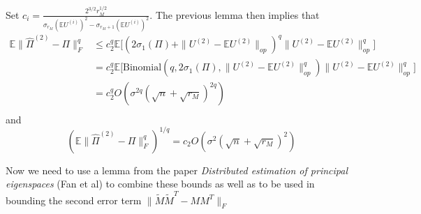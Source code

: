 \documentclass[notheorems]{beamer}
\theoremstyle{definition}
\begin{document}
\begin{frame}
Set $c_i = \frac{2^{3/2}r_M^{1/2}}{\sigma_{r_M}(\mathbb{E}U^{(i)})^2 - \sigma_{r_M + 1}(\mathbb{E}U^{(i)})^2}$. The previous lemma then implies that
\begin{align*}
    \mathbb{E}\|\hat{\Pi}^{(2)} - \Pi \|_F^q
    &\leq c_2^q \mathbb{E}\bigg[ (2 \sigma_1(\Pi) +  \|U^{(2)} - \mathbb{E}U^{(2)}\|_{op})^q \|U^{(2)} - \mathbb{E}U^{(2)}\|_{op}^q \bigg] \\
    &= c_2^q \mathbb{E}\bigg[\text{Binomial}(q, 2 \sigma_1(\Pi), \|U^{(2)} - \mathbb{E}U^{(2)}\|_{op}^{q} ) \|U^{(2)} - \mathbb{E}U^{(2)}\|_{op}^{q}  \bigg]\\
    &= c_2^q O(\sigma^{2q}(\sqrt{n} + \sqrt{r_M})^{2q})\\
\end{align*}
and 
$$(\mathbb{E}\|\hat{\Pi}^{(2)} - \Pi \|_F^q)^{1/q} = c_2 O(\sigma^2 (\sqrt{n} + \sqrt{r_M})^2)$$
\end{frame}















\begin{frame}
Now we need to use a lemma from the paper \emph{Distributed estimation of principal eigenspaces} (Fan et al) to combine these bounds as well as to be used in bounding the second error term $\|\tilde{M}\tilde{M}^T - MM^T\|_F$ 
\end{frame}


















\end{document}
